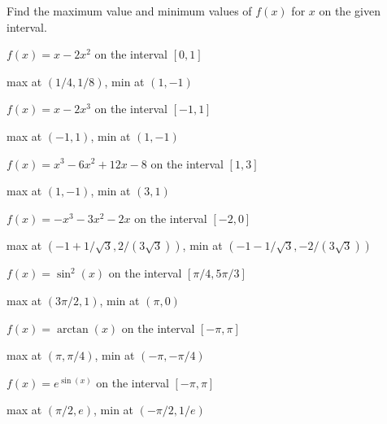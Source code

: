 \begin{exercises}
\noindent Find the maximum value and minimum values of $f(x)$ for $x$
on the given interval.

\begin{exercise}
$f(x) = x-2x^2$ on the interval $[0,1]$
\begin{answer}
max at $(1/4,1/8)$, min at $(1,-1)$
\end{answer}
\end{exercise}

\begin{exercise}
$f(x) = x-2x^3$ on the interval $[-1,1]$
\begin{answer}
max at $(-1,1)$, min at $(1,-1)$
\end{answer}
\end{exercise}

\begin{exercise}
$f(x) = x^3-6x^2+12x-8$ on the interval $[1,3]$
\begin{answer}
max at $(1,-1)$, min at $(3,1)$
\end{answer}
\end{exercise}

\begin{exercise}
$f(x) = -x^3-3x^2-2x$ on the interval $[-2,0]$
\begin{answer}
max at $(-1+1/\sqrt{3},2/(3\sqrt{3}))$, min at
$(-1-1/\sqrt{3},-2/(3\sqrt{3}))$
\end{answer}
\end{exercise}

\begin{exercise}
$f(x) = \sin^2(x)$ on the interval $[\pi/4,5\pi/3]$
\begin{answer}
max at $(3\pi/2,1)$, min at
$(\pi,0)$
\end{answer}
\end{exercise}

\begin{exercise}
$f(x) = \arctan(x)$ on the interval $[-\pi,\pi]$
\begin{answer}
max at $(\pi,\pi/4)$, min at
$(-\pi,-\pi/4)$
\end{answer}
\end{exercise}

\begin{exercise}
$f(x) = e^{\sin(x)}$ on the interval $[-\pi,\pi]$
\begin{answer}
max at $(\pi/2,e)$, min at
$(-\pi/2,1/e)$
\end{answer}
\end{exercise}


\end{exercises}
